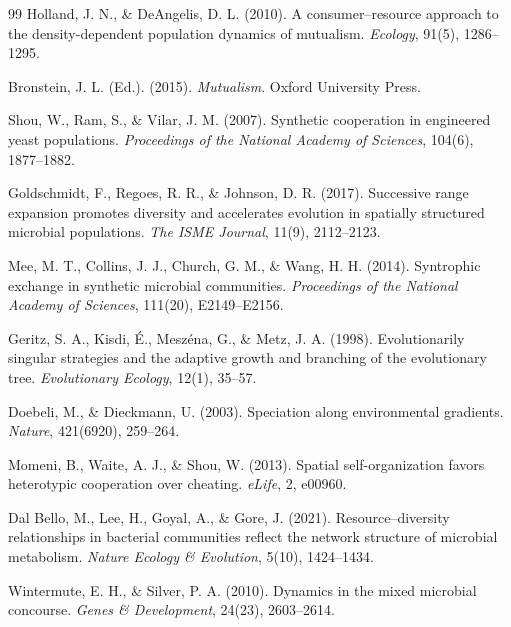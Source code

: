 \documentclass[11pt]{article}
\begin{document}
\begin{thebibliography}{99}
Holland, J. N., \& DeAngelis, D. L. (2010). A consumer--resource approach to the density-dependent population dynamics of mutualism. \textit{Ecology}, 91(5), 1286--1295.

Bronstein, J. L. (Ed.). (2015). \textit{Mutualism}. Oxford University Press.

Shou, W., Ram, S., \& Vilar, J. M. (2007). Synthetic cooperation in engineered yeast populations. \textit{Proceedings of the National Academy of Sciences}, 104(6), 1877--1882.

Goldschmidt, F., Regoes, R. R., \& Johnson, D. R. (2017). Successive range expansion promotes diversity and accelerates evolution in spatially structured microbial populations. \textit{The ISME Journal}, 11(9), 2112--2123.

Mee, M. T., Collins, J. J., Church, G. M., \& Wang, H. H. (2014). Syntrophic exchange in synthetic microbial communities. \textit{Proceedings of the National Academy of Sciences}, 111(20), E2149--E2156.

Geritz, S. A., Kisdi, É., Meszéna, G., \& Metz, J. A. (1998). Evolutionarily singular strategies and the adaptive growth and branching of the evolutionary tree. \textit{Evolutionary Ecology}, 12(1), 35--57.

Doebeli, M., \& Dieckmann, U. (2003). Speciation along environmental gradients. \textit{Nature}, 421(6920), 259--264.

Momeni, B., Waite, A. J., \& Shou, W. (2013). Spatial self-organization favors heterotypic cooperation over cheating. \textit{eLife}, 2, e00960.

Dal Bello, M., Lee, H., Goyal, A., \& Gore, J. (2021). Resource–diversity relationships in bacterial communities reflect the network structure of microbial metabolism. \textit{Nature Ecology \& Evolution}, 5(10), 1424--1434.

Wintermute, E. H., \& Silver, P. A. (2010). Dynamics in the mixed microbial concourse. \textit{Genes \& Development}, 24(23), 2603--2614.

\end{thebibliography}
\end{document}
